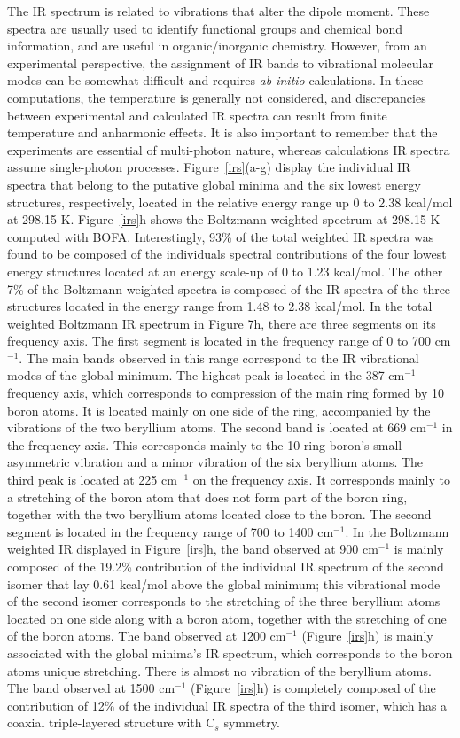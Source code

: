 \documentclass[prb,aps,preprint,showkeys,showpacs]{revtex4}
\begin{document}
The IR spectrum is related to vibrations that alter the dipole moment. These spectra are usually used to identify functional groups and chemical bond information, and are useful in organic/inorganic chemistry. However, from an experimental perspective, the assignment of IR bands to vibrational molecular modes can be somewhat difficult and requires \emph{ab-initio} calculations. In these computations, the temperature is generally not considered, and discrepancies between experimental and calculated IR spectra can result from finite temperature and anharmonic effects. It is also important to remember that the experiments are essential of multi-photon nature, whereas calculations IR spectra assume single-photon processes. Figure~\ref{irs}(a-g) display the individual IR spectra that belong to the putative global minima and the six lowest energy structures, respectively, located in the relative energy range up 0 to 2.38 kcal/mol at 298.15 K. Figure~\ref{irs}h shows the Boltzmann weighted spectrum at 298.15 K computed with BOFA. Interestingly, 93{\%} of the total weighted IR spectra was found to be composed of the individuals spectral contributions of the four lowest energy structures located at an energy scale-up of 0 to 1.23 kcal/mol. The other 7{\%} of the Boltzmann weighted spectra is composed of the IR spectra of the three structures located in the energy range from 1.48 to 2.38 kcal/mol. In the total weighted Boltzmann IR spectrum in Figure 7h, there are three segments on its frequency axis. The first segment is located in the frequency range of 0 to 700 cm$^{-1}$. The main bands observed in this range correspond to the IR vibrational modes of the global minimum. The highest peak is located in the 387 cm$^{-1}$ frequency axis, which corresponds to compression of the main ring formed by 10 boron atoms. It is located mainly on one side of the ring, accompanied by the vibrations of the two beryllium atoms. The second band is located at 669 cm$^{-1}$ in the frequency axis. This corresponds mainly to the 10-ring boron’s small asymmetric vibration and a minor vibration of the six beryllium atoms. The third peak is located at 225 cm$^{-1}$ on the frequency axis. It corresponds mainly to a stretching of the boron atom that does not form part of the boron ring, together with the two beryllium atoms located close to the boron. The second segment is located in the frequency range of 700 to 1400 cm$^{-1}$. In the Boltzmann weighted IR displayed in Figure~\ref{irs}h, the band observed at 900 cm$^{-1}$ is mainly composed of the 19.2{\%} contribution of the individual IR spectrum of the second isomer that lay 0.61 kcal/mol above the global minimum; this vibrational mode of the second isomer corresponds to the stretching of the three beryllium atoms located on one side along with a boron atom, together with the stretching of one of the boron atoms. The band observed at 1200 cm$^{-1}$ (Figure~\ref{irs}h) is mainly associated with the global minima’s IR spectrum, which corresponds to the boron atoms unique stretching. There is almost no vibration of the beryllium atoms. The band observed at 1500 cm$^{-1}$ (Figure~\ref{irs}h) is completely composed of the contribution of 12{\%} of the individual IR spectra of the third isomer, which has a coaxial triple-layered structure with C$_s$ symmetry. 
\end{document}
